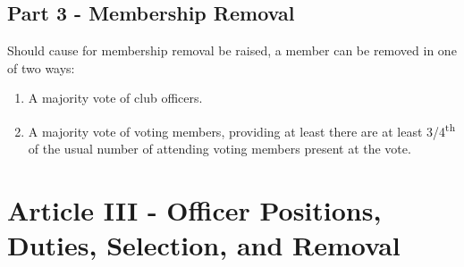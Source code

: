 \documentclass{article}
\begin{document}
	\subsection{Part 3 - Membership Removal}

	Should cause for membership removal be raised, a member can be removed in one of two ways:
	\begin{enumerate}
		\item A majority vote of club officers.
		\item A majority vote of voting members, providing at least there are at least 3/4\textsuperscript{th} of the usual number of attending voting members present at the vote.
	\end{enumerate}

	\section{Article III - Officer Positions, Duties, Selection, and Removal}




\end{document}
